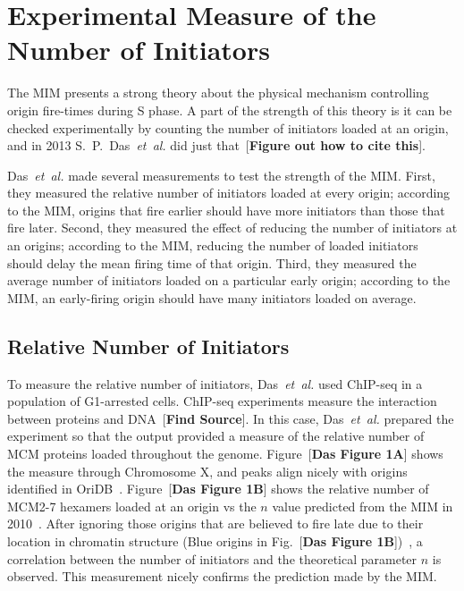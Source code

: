 	\section{Experimental Measure of the Number of Initiators}
	\label{sec:ExperimentsMIM}
	
	The MIM presents a strong theory about the physical mechanism controlling origin fire-times during S phase.
	A part of the strength of this theory is it can be checked experimentally by counting the number of initiators loaded at an origin, and in 2013 S.~P.~Das~\emph{et~al.} did just that~[\textbf{Figure out how to cite this}].
	
	Das~\emph{et~al.} made several measurements to test the strength of the MIM.
	First, they measured the relative number of initiators loaded at every origin; according to the MIM, origins that fire earlier should have more initiators than those that fire later.
	Second, they measured the effect of reducing the number of initiators at an origins; according to the MIM, reducing the number of loaded initiators should delay the mean firing time of that origin.
	Third, they measured the average number of initiators loaded on a particular early origin; according to the MIM, an early-firing origin should have many initiators loaded on average.
	
		\subsection{Relative Number of Initiators}
		\label{subsec:RelativeNo}
		
		To measure the relative number of initiators, Das~\emph{et~al.} used ChIP-seq in a population of G1-arrested cells.
		ChIP-seq experiments measure the interaction between proteins and DNA~[\textbf{Find Source}].
		In this case, Das~\emph{et~al.} prepared the experiment so that the output provided a measure of the relative number of MCM proteins loaded throughout the genome.
		Figure~[\textbf{Das Figure 1A}] shows the measure through Chromosome X, and peaks align nicely with origins identified in OriDB~\cite{OriDB}.
		Figure~[\textbf{Das Figure 1B}] shows the relative number of MCM2-7 hexamers loaded at an origin vs the $n$ value predicted from the MIM in 2010~\cite{ScottsPaper}.
		After ignoring those origins that are believed to fire late due to their location in chromatin structure (Blue origins in Fig.~[\textbf{Das Figure 1B}])~\cite{Chromatin}, a correlation between the number of initiators and the theoretical parameter $n$ is observed.
		This measurement nicely confirms the prediction made by the MIM.
		
